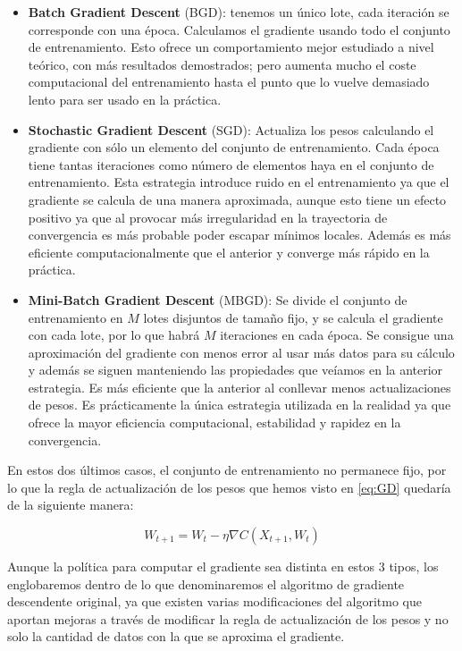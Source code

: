 \begin{itemize}
    \item \textbf{Batch Gradient Descent} (BGD): tenemos un único lote, cada iteración se corresponde con una época. Calculamos el gradiente usando todo el conjunto de entrenamiento. Esto ofrece un comportamiento mejor estudiado a nivel teórico, con más resultados demostrados; pero aumenta mucho el coste computacional del entrenamiento hasta el punto que lo vuelve demasiado lento para ser usado en la práctica.

    \item \textbf{Stochastic Gradient Descent} (SGD): Actualiza los pesos calculando el gradiente con sólo un elemento del conjunto de entrenamiento. Cada época tiene tantas iteraciones como número de elementos haya en el conjunto de entrenamiento. Esta estrategia introduce ruido en el entrenamiento ya que el gradiente se calcula de una manera aproximada, aunque esto tiene un efecto positivo ya que al provocar más irregularidad en la trayectoria de convergencia es más probable poder escapar mínimos locales. Además es más eficiente computacionalmente que el anterior y converge más rápido en la práctica.

    \item \textbf{Mini-Batch Gradient Descent} (MBGD): Se divide el conjunto de entrenamiento en $M$ lotes disjuntos de tamaño fijo, y se calcula el gradiente con cada lote, por lo que habrá $M$ iteraciones en cada época. Se consigue una aproximación del gradiente con menos error al usar más datos para su cálculo y además se siguen manteniendo las propiedades que veíamos en la anterior estrategia. Es más eficiente que la anterior al conllevar menos actualizaciones de pesos. Es prácticamente la única estrategia utilizada en la realidad ya que ofrece la mayor eficiencia computacional, estabilidad y rapidez en la convergencia.
\end{itemize}

En estos dos últimos casos, el conjunto de entrenamiento no permanece fijo, por lo que la regla de actualización de los pesos que hemos visto en \ref{eq:GD} quedaría de la siguiente manera:

\begin{equation}\label{eq:SGD}
	W_{t+1} = W_t - \eta \nabla C(X_{t+1}, W_t)
\end{equation}

Aunque la política para computar el gradiente sea distinta en estos 3 tipos, los englobaremos dentro de lo que denominaremos el algoritmo de gradiente descendente original, ya que existen varias modificaciones del algoritmo que aportan mejoras a través de modificar la regla de actualización de los pesos y no solo la cantidad de datos con la que se aproxima el gradiente.

